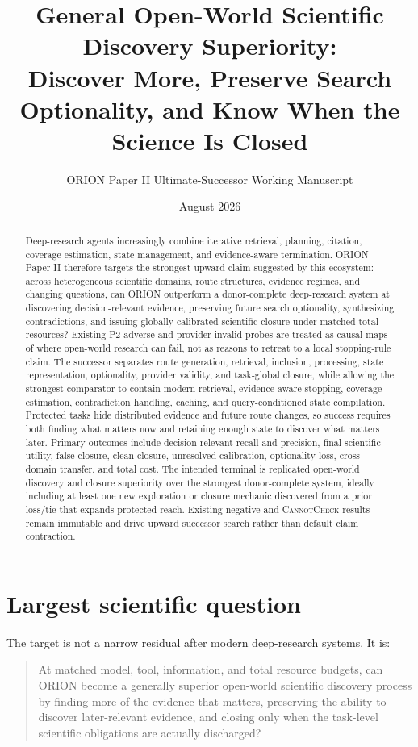 \documentclass[11pt]{article}
\title{General Open-World Scientific Discovery Superiority:\\
Discover More, Preserve Search Optionality, and Know When the Science Is Closed}
\author{ORION Paper II Ultimate-Successor Working Manuscript}
\date{August 2026}
\begin{document}
\maketitle

\begin{abstract}
Deep-research agents increasingly combine iterative retrieval, planning, citation, coverage estimation, state management, and evidence-aware termination. ORION Paper II therefore targets the strongest upward claim suggested by this ecosystem: across heterogeneous scientific domains, route structures, evidence regimes, and changing questions, can ORION outperform a donor-complete deep-research system at discovering decision-relevant evidence, preserving future search optionality, synthesizing contradictions, and issuing globally calibrated scientific closure under matched total resources? Existing P2 adverse and provider-invalid probes are treated as causal maps of where open-world research can fail, not as reasons to retreat to a local stopping-rule claim. The successor separates route generation, retrieval, inclusion, processing, state representation, optionality, provider validity, and task-global closure, while allowing the strongest comparator to contain modern retrieval, evidence-aware stopping, coverage estimation, contradiction handling, caching, and query-conditioned state compilation. Protected tasks hide distributed evidence and future route changes, so success requires both finding what matters now and retaining enough state to discover what matters later. Primary outcomes include decision-relevant recall and precision, final scientific utility, false closure, clean closure, unresolved calibration, optionality loss, cross-domain transfer, and total cost. The intended terminal is replicated open-world discovery and closure superiority over the strongest donor-complete system, ideally including at least one new exploration or closure mechanic discovered from a prior loss/tie that expands protected reach. Existing negative and \textsc{CannotCheck} results remain immutable and drive upward successor search rather than default claim contraction.
\end{abstract}

\section{Largest scientific question}
The target is not a narrow residual after modern deep-research systems. It is:
\begin{quote}
At matched model, tool, information, and total resource budgets, can ORION become a generally superior open-world scientific discovery process by finding more of the evidence that matters, preserving the ability to discover later-relevant evidence, and closing only when the task-level scientific obligations are actually discharged?
\end{quote}
\end{document}
